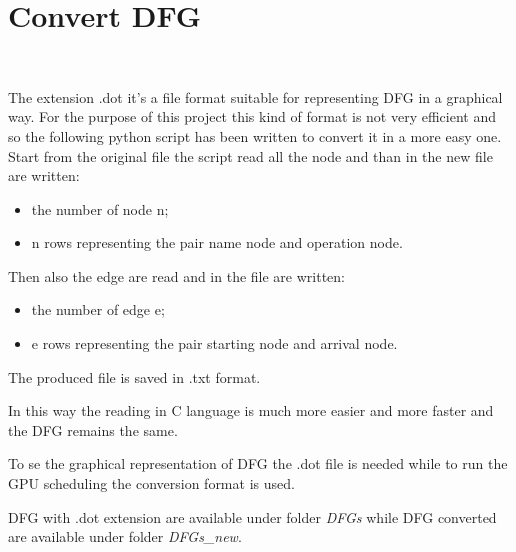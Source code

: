 \chapter{Convert DFG}\
\label{appendix1}

The extension .dot it's a file format suitable for 
representing DFG in a graphical way. For the purpose of
this project this kind of format is not very efficient and so     
the following python script has been written to convert 
it in a more easy one. Start from the original file
the script read all the node and than in the new file are written:

\begin{itemize}
    \item the number of node n;
    \item n rows representing the pair name node and operation node.
\end{itemize}

Then also the edge are read and in the file are written:

\begin{itemize}
    \item the number of edge e;
    \item e rows representing the pair starting node and arrival node.
\end{itemize}

The produced file is saved in .txt format.

In this way the reading in C language is much more easier and more faster and the DFG remains the same.

To se the graphical representation of DFG the .dot file is needed while to run the GPU scheduling 
the conversion format is used.

DFG with .dot extension are available under folder \emph{DFGs} while DFG converted are 
available under folder \emph{DFGs\_new}.